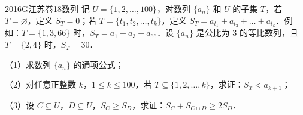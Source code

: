 
\begin{problem}{2016}{G}{江苏卷}{18}{数列}
记 $U=\{1,2,\dots,100\}$，对数列 $\{a_n\}$ 和 $U$ 的子集 $T$，若 $T=\varnothing$，定义 $S_T=0$；若 $T=\{t_1,t_2,\dots,t_k\}$，定义 $S_T=a_{t_1}+a_{t_2}+\dots+a_{t_k}$．例如：$T=\{1,3,66\}$ 时，$S_T=a_1+a_3+a_{66}$．设 $\{a_n\}$ 是公比为 $3$ 的等比数列，且 $T=\{2,4\}$ 时，$S_T=30$．

（1）求数列 $\{a_n\}$ 的通项公式；

（2）对任意正整数 $k$，$1\le k\le 100$，若 $T\subseteq\{1,2,\dots,k\}$，求证：$S_T<a_{k+1}$；

（3）设 $C\subseteq U$，$D\subseteq U$，$S_C\ge S_D$，求证：$S_C+S_{C\cap D}\ge 2S_D$．
\end{problem}
